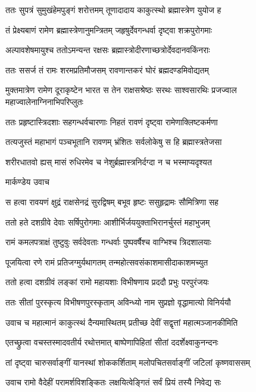 \twolineshloka
{ततः सुपत्रं सुमुखंहेमपुङ्गं शरोत्तमम्}
{तूणादादाय काकुत्स्थो ब्रह्मास्त्रेण युयोज ह}


\twolineshloka
{तं प्रेक्ष्यबाणं रामेण ब्रह्मास्त्रेणानुमन्त्रितम्}
{जहृषुर्देवगन्धर्वा दृष्ट्वा शक्रपुरोगमाः}


\twolineshloka
{अल्पावशेषमायुश्च ततोऽमन्यन्त रक्षसः}
{ब्रह्मास्त्रोदीरणाच्छत्रोर्देवदानवकिंनराः}


\twolineshloka
{ततः ससर्ज तं रामः शरमप्रतिमौजसम्}
{रावणान्तकरं घोरं ब्रह्मदण्डमिवोद्यतम्}


\threelineshloka
{मुक्तमात्रेण रामेण दूराकृष्टेन भारत}
{स तेन राक्षसश्रेष्ठः सरथः साश्वसारथिः}
{प्रजज्वाल महाज्वालेनाग्निनाभिपरिप्लुतः}


\twolineshloka
{ततः प्रहृष्टास्त्रिदशाः सहगन्धर्वचारणाः}
{निहतं रावणं दृष्ट्वा रामेणाक्लिष्टकर्मणा}


\twolineshloka
{तत्यजुस्तं महाभागं पञ्चभूतानि रावणम्}
{भ्रंशितः सर्वलोकेषु स हि ब्रह्मास्त्रतेजसा}


\twolineshloka
{शरीरधातवो ह्यस् मासं रुधिरमेव च}
{नेशुर्ब्रह्मास्त्रनिर्दग्दा न च भस्माप्यदृश्यत}


\twolineshloka
{मार्कण्डेय उवाच}
{}


\twolineshloka
{स हत्वा रावयणं क्षुद्रं राक्षसेनद्रं सुरद्विषम्}
{बभूव हृष्टः ससुहृद्रामः सौमित्रिणा सह}


\twolineshloka
{ततो हते दशग्रीवे देवाः सर्षिपुरोगमाः}
{आशीर्भिर्जययुक्ताभिरानर्चुस्तं महाभुजम्}


\twolineshloka
{रामं कमलपत्राक्षं तुष्टुवुः सर्वदेवताः}
{गन्धर्वाः पुष्पवर्षैश्च वाग्भिश्च त्रिदशालयाः}


\twolineshloka
{पूजयित्वा रणे रामं प्रतिजग्मुर्यथागतम्}
{तन्महोत्सवसंकाशमासीदाकाशमच्युत}


\twolineshloka
{ततो हत्वा दशग्रीवं लङ्कां रामो महायशाः}
{विभीषणाय प्रददौ प्रभुः परपुरंजयः}


\twolineshloka
{ततः सीतां पुरस्कृत्य विभीषणपुरस्कृताम्}
{अविन्ध्यो नाम सुप्रज्ञो वृद्धामात्यो विनिर्ययौ}


\twolineshloka
{उवाच च महात्मानं काकुत्स्थं दैन्यमास्थितम्}
{प्रतीच्छ देवीं सद्वृत्तां महात्मञ्जानकीमिति}


\twolineshloka
{एतच्छ्रुत्वा वचस्तस्मादवतीर्य रथोत्तमात्}
{बाष्पेणापिहितां सीतां ददर्शेक्ष्वाकुनन्दनः}


\twolineshloka
{तां दृष्ट्वा चारुसर्वाङ्गीं यानस्थां शोककर्शिताम्}
{मलोपचितसर्वाङ्गीं जटिलां कृष्णवाससम्}


\twolineshloka
{उवाच रामो वैदेहीं परामर्शविशङ्कितः}
{लक्षयित्वेङ्गितं सर्वं प्रियं तस्यै निवेद्य सः}


